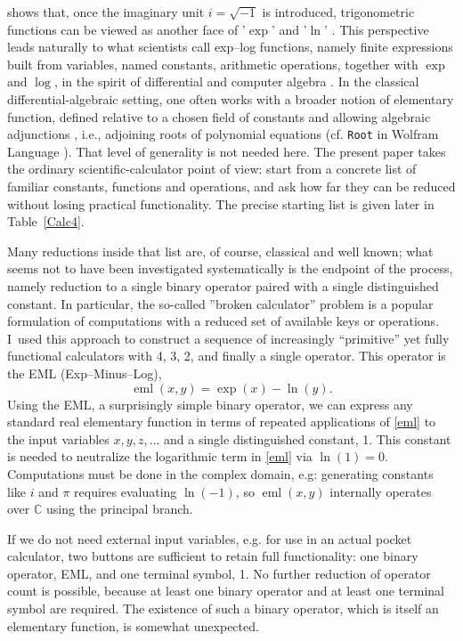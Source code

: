 \documentclass[12pt]{article}
\DeclareMathOperator{\eml}{eml}
\begin{document}
shows that, once the imaginary unit $i\!=\!\sqrt{-1}$ is introduced, trigonometric functions can be viewed as another face of '$\exp$' and '$\ln$' \cite{Liouville1835}.  This perspective leads naturally to what scientists call exp--log functions, namely finite expressions built from variables, named constants, arithmetic operations, together with $\exp$ and $\log$, in the spirit of differential and computer algebra \cite{SHACKELL1990611,Richardson:1996:AEF}. In the classical differential-algebraic setting, one often works with a broader notion of elementary function, defined relative to a chosen field of constants and allowing algebraic adjunctions \cite{Ritt1948}, i.e., adjoining roots of polynomial equations (cf. \verb!Root! in Wolfram Language  \cite{WolframMathematica}). That level of generality is not needed here. The present paper takes the ordinary scientific-calculator point of view: start from a concrete list of familiar constants, functions and operations, and ask how far they can be reduced without losing practical functionality. The precise starting list is given later in Table~\ref{Calc4}. 


Many reductions inside that list are, of course, classical and well known; what seems not to have been investigated systematically is the endpoint of the process, namely reduction to a single binary operator paired with a single distinguished constant. In particular, the so-called ''broken calculator'' problem \cite{BrokenCalculatorMathForLove} is a popular formulation of computations with a reduced set of available keys or operations. I~used this approach to construct a sequence of increasingly “primitive” yet fully functional calculators with 4, 3, 2, and finally a single operator. This operator is the EML (Exp--Minus--Log),
\begin{equation}
\label{eml}
\eml{(x,y)} = \exp{(x)} - \ln{(y)}.
\end{equation}
Using the EML, a surprisingly simple binary operator, we can express any standard real elementary function in terms of repeated applications of \eqref{eml} to the input variables $x,y,z,\ldots$
and a single distinguished constant, 1. This constant is needed to neutralize the logarithmic term in \eqref{eml} via $\ln{(1)}\!=\!0$. Computations must be done in the complex domain, e.g: generating constants like $i$ and $\pi$ requires evaluating $\ln(-1)$, so $\eml(x,y)$ internally operates over $\mathbb{C}$ using the principal branch. 


If we do not need external input variables, e.g. for use in an actual pocket calculator, two buttons are sufficient to retain full functionality: one binary operator, EML, and one terminal symbol, 1. No further reduction of operator count is possible, because at least one binary operator and at least one terminal symbol are required. The existence of such a binary operator, which is itself an elementary function, is somewhat unexpected.
\end{document}
